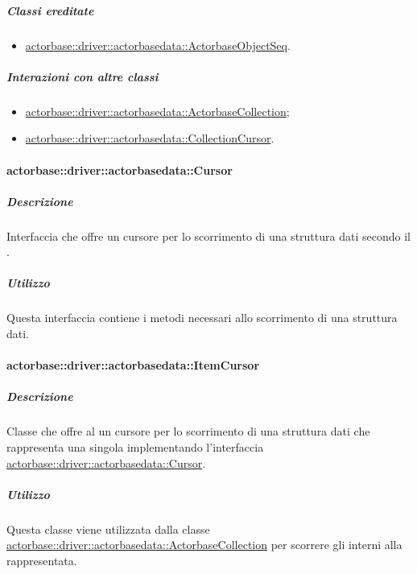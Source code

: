 \documentclass{scalatekids-article}
\begin{document}
\subparagraph{Classi ereditate}

\begin{itemize}
\item \hyperref[sec:actorbase::driver::actorbasedata::ActorbaseObjectSeq]{actorbase::driver::actorbasedata::ActorbaseObjectSeq}.
\end{itemize}

\subparagraph{Interazioni con altre classi}

\begin{itemize}
\item \hyperref[sec:actorbase::driver::actorbasedata::ActorbaseCollection]{actorbase::driver::actorbasedata::ActorbaseCollection};
\item \hyperref[sec:actorbase::driver::actorbasedata::CollectionCursor]{actorbase::driver::actorbasedata::CollectionCursor}.
\end{itemize}

\paragraph{actorbase::driver::actorbasedata::Cursor}
\label{sec:actorbase::driver::actorbasedata::Cursor}

\subparagraph{Descrizione}

Interfaccia che offre un cursore per lo scorrimento di una struttura dati
secondo il  .

\subparagraph{Utilizzo}

Questa interfaccia contiene i metodi necessari allo scorrimento di una
struttura dati.

\paragraph{actorbase::driver::actorbasedata::ItemCursor}
\label{sec:actorbase::driver::actorbasedata::ItemCursor}

\subparagraph{Descrizione}

Classe che offre al  un cursore per lo scorrimento di una struttura dati
che rappresenta una singola  implementando l'interfaccia
\hyperref[sec:actorbase::driver::actorbasedata::Cursor]{actorbase::driver::actorbasedata::Cursor}.

\subparagraph{Utilizzo}

Questa classe viene utilizzata dalla classe
\hyperref[sec:actorbase::driver::actorbasedata::ActorbaseCollection]{actorbase::driver::actorbasedata::ActorbaseCollection}
per scorrere gli  interni alla 
rappresentata.
\end{document}
